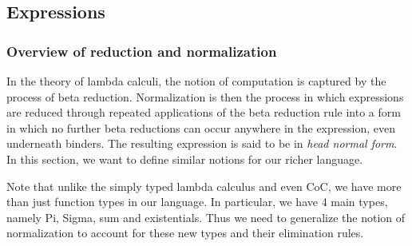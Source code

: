 \documentclass{article}
\begin{document}
\subsection{Expressions}
\subsubsection{Overview of reduction and normalization}
In the theory of lambda calculi, the notion of computation is captured by the
process of beta reduction. Normalization is then the process in which
expressions are reduced through repeated applications of the beta reduction
rule into a form in which no further beta reductions can occur anywhere in the
expression, even underneath binders.
The resulting expression is said to be in \textit{head normal form}. 
In this section, we want to define similar notions for our richer language.

Note that unlike the simply typed lambda calculus and even CoC, we have more
than just function types in our language. In particular, we have 4 main types,
namely Pi, Sigma, sum and existentials.
Thus we need to generalize the notion of normalization to account for these new
types and their elimination rules.






\end{document}
